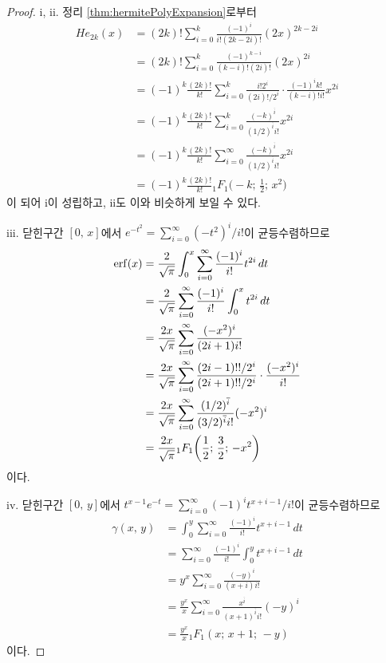 \begin{proof}
    i, ii. 정리 \ref{thm:hermitePolyExpansion}로부터
    \begin{align*}
        He_{2k}(x)&=(2k)!\sum_{i=0}^k\frac{(-1)^i}{i!(2k-2i)!}(2x)^{2k-2i}\\
        &=(2k)!\sum_{i=0}^k\frac{(-1)^{k-i}}{(k-i)!(2i)!}(2x)^{2i}\\
        &=(-1)^k\frac{(2k)!}{k!}\sum_{i=0}^k\frac{i!2^i}{(2i)!/2^i}\cdot\frac{(-1)^ik!}{(k-i)!i!}x^{2i}\\
        &=(-1)^k\frac{(2k)!}{k!}\sum_{i=0}^k\frac{(-k)^{\overline{i}}}{(1/2)^{\overline{i}}i!}x^{2i}\\
        &=(-1)^k\frac{(2k)!}{k!}\sum_{i=0}^\infty\frac{(-k)^{\overline{i}}}{(1/2)^{\overline{i}}i!}x^{2i}\\
        &=(-1)^k\frac{(2k)!}{k!}{}_1F_1\bigg(-k;\,\frac{1}{2};\,x^2\bigg)
    \end{align*}
    이 되어 i이 성립하고, ii도 이와 비슷하게 보일 수 있다.

    iii. 닫힌구간 $[0,\,x]$에서 $e^{-t^2}=\sum_{i=0}^\infty(-t^2)^i/i!$이 균등수렴하므로
    \begin{align*}
        \mathrm{erf}(x)&=\frac{2}{\sqrt{\pi}}\int_0^x\sum_{i=0}^\infty\frac{(-1)^i}{i!}t^{2i}\,dt\\
        &=\frac{2}{\sqrt{\pi}}\sum_{i=0}^\infty\frac{(-1)^i}{i!}\int_0^xt^{2i}\,dt\\
        &=\frac{2x}{\sqrt{\pi}}\sum_{i=0}^\infty\frac{(-x^2)^{i}}{(2i+1)i!}\\
        &=\frac{2x}{\sqrt{\pi}}\sum_{i=0}^\infty\frac{(2i-1)!!/2^i}{(2i+1)!!/2^i}\cdot\frac{(-x^2)^{i}}{i!}\\
        &=\frac{2x}{\sqrt{\pi}}\sum_{i=0}^\infty\frac{(1/2)^{\overline{i}}}{(3/2)^{\overline{i}}i!}(-x^2)^{i}\\
        &=\frac{2x}{\sqrt{\pi}}{}_1F_1\bigg(\dfrac{1}{2};\,\dfrac{3}{2};\,-x^2\bigg)
    \end{align*}
    이다.

    iv. 닫힌구간 $[0,\,y]$에서 $t^{x-1}e^{-t}=\sum_{i=0}^\infty(-1)^it^{x+i-1}/i!$이 균등수렴하므로
    \begin{align*}
        \gamma(x,\,y)&=\int_0^y\sum_{i=0}^\infty\frac{(-1)^i}{i!}t^{x+i-1}\,dt\\
        &=\sum_{i=0}^\infty\frac{(-1)^i}{i!}\int_0^yt^{x+i-1}\,dt\\
        &=y^x\sum_{i=0}^\infty\frac{(-y)^i}{(x+i)i!}\\
        &=\frac{y^x}{x}\sum_{i=0}^\infty\frac{x^{\overline{i}}}{(x+1)^{\overline{i}}i!}(-y)^i\\
        &=\frac{y^x}{x}{}_1F_1(x;\,x+1;\,-y)
    \end{align*}
    이다.


\end{proof}
